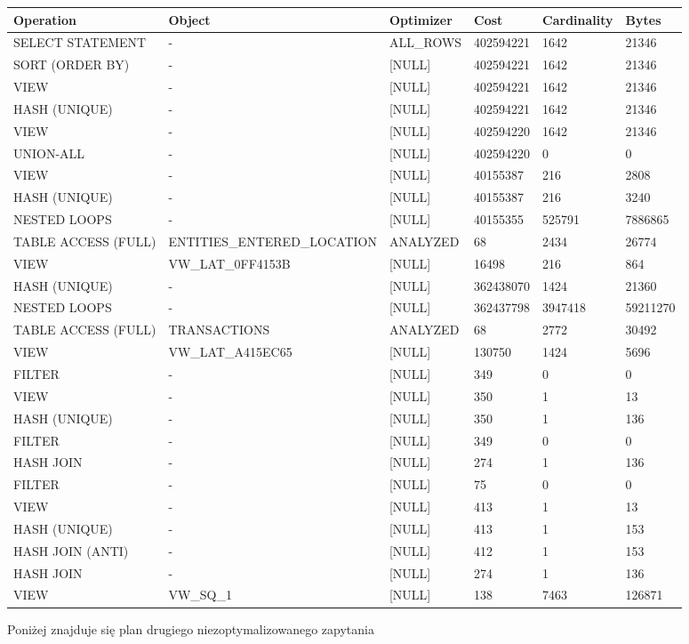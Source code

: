 \documentclass[11pt]{article}
\numberwithin{figure}{subsection}
\begin{document}
		\begin{tabularx}{\textwidth}{|X|X|X|X|X|X|}
Operation&Object&Optimizer&Cost&Cardinality&Bytes\\ \hline
SELECT STATEMENT& - &ALL\_ROWS&402594221&1642&21346\\ \hline
SORT (ORDER BY)& - &[NULL]&402594221&1642&21346\\ \hline
VIEW& - &[NULL]&402594221&1642&21346\\ \hline
HASH (UNIQUE)& - &[NULL]&402594221&1642&21346\\ \hline
VIEW& - &[NULL]&402594220&1642&21346\\ \hline
UNION-ALL& - &[NULL]&402594220&0&0\\ \hline
VIEW& - &[NULL]&40155387&216&2808\\ \hline
HASH (UNIQUE)& - &[NULL]&40155387&216&3240\\ \hline
NESTED LOOPS& - &[NULL]&40155355&525791&7886865\\ \hline
TABLE ACCESS (FULL)&ENTITIES\_ENTERED\_LOCATION&ANALYZED&68&2434&26774\\ \hline
VIEW&VW\_LAT\_0FF4153B&[NULL]&16498&216&864\\ \hline
HASH (UNIQUE)& - &[NULL]&362438070&1424&21360\\ \hline
NESTED LOOPS& - &[NULL]&362437798&3947418&59211270\\ \hline
TABLE ACCESS (FULL)&TRANSACTIONS&ANALYZED&68&2772&30492\\ \hline
VIEW&VW\_LAT\_A415EC65&[NULL]&130750&1424&5696\\ \hline
FILTER& - &[NULL]&349&0&0\\ \hline
VIEW& - &[NULL]&350&1&13\\ \hline
HASH (UNIQUE)& - &[NULL]&350&1&136\\ \hline
FILTER& - &[NULL]&349&0&0\\ \hline
HASH JOIN& - &[NULL]&274&1&136\\ \hline
FILTER& - &[NULL]&75&0&0\\ \hline
VIEW& - &[NULL]&413&1&13\\ \hline
HASH (UNIQUE)& - &[NULL]&413&1&153\\ \hline
HASH JOIN (ANTI)& - &[NULL]&412&1&153\\ \hline
HASH JOIN& - &[NULL]&274&1&136\\ \hline
VIEW&VW\_SQ\_1&[NULL]&138&7463&126871\\ \hline
		\end{tabularx}
		
		Poniżej znajduje się plan drugiego niezoptymalizowanego zapytania \\
		
\end{document}
